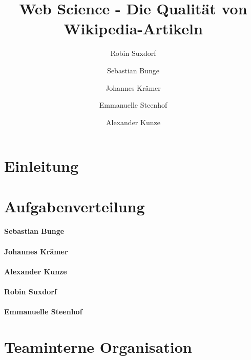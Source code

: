 \documentclass[researchlab,palatino]{AIGpaper}
\author{Robin Suxdorf \and Sebastian Bunge \and Johannes Krämer \and Emmanuelle Steenhof \and Alexander Kunze}
\title{Web Science - Die Qualität von Wikipedia-Artikeln}
\begin{document}
\maketitle %


\section{Einleitung}


\section{Aufgabenverteilung}
\label{Aufgabenverteilung}


\paragraph{Sebastian Bunge}


\paragraph{Johannes Krämer}


\paragraph{Alexander Kunze}


\paragraph{Robin Suxdorf}


\paragraph{Emmanuelle Steenhof}


\section{Teaminterne Organisation}
\label{Organisation}

\end{document}
